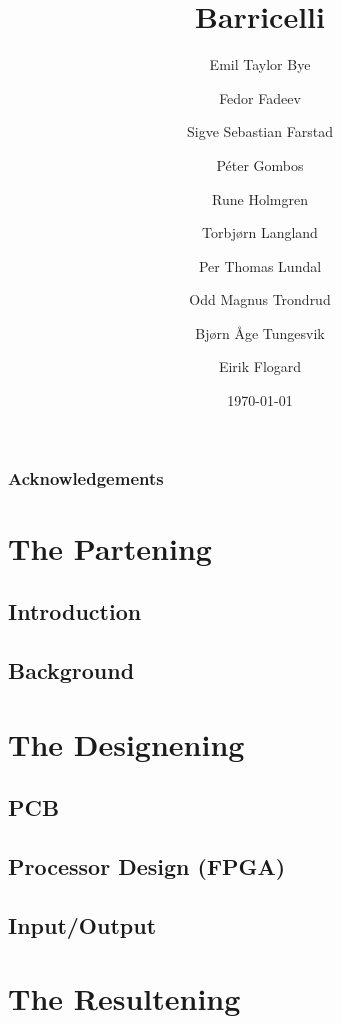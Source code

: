 \documentclass{report}
\title{Barricelli}
\date{\today}
\author{Emil Taylor Bye
     \and Fedor Fadeev
     \and Sigve Sebastian Farstad
     \and Péter Gombos
     \and Rune Holmgren
     \and Torbjørn Langland
     \and Per Thomas Lundal
     \and Odd Magnus Trondrud
     \and Bjørn Åge Tungesvik
     \and Eirik Flogard
}
\begin{document}


\maketitle

\begin{abstract}
	
\end{abstract}


\tableofcontents

\section{Acknowledgements}

\part{The Partening}

\chapter{Introduction}
	

\chapter{Background}
	

\part{The Designening}

\chapter{PCB}
	

\chapter{Processor Design (FPGA)}
	

\chapter{Input/Output}
	

\part{The Resultening}
\end{document}
